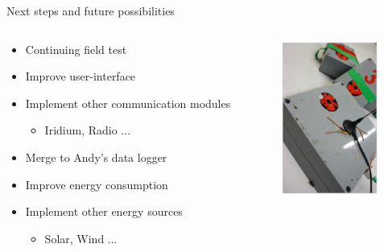 \documentclass{beamer}
\begin{document}
\begin{frame}{Next steps and future possibilities}
\begin{columns}[T]
	\begin{column}[T]{7cm}
		\begin{itemize}
		\item Continuing field test
		\item Improve user-interface
		\item Implement other communication modules
			\begin{itemize}
			\item Iridium, Radio ...
			\end{itemize}
		\item Merge to Andy's data logger
		\item Improve energy consumption
		\item Implement other energy sources 
			\begin{itemize}
			\item Solar, Wind ...
			\end{itemize}
		\end{itemize}
	\end{column}
	\begin{column}[T]{4cm}
	\includegraphics[height=5cm]{graphics/Field_pictures/Dirty_system.JPG}
	\end{column}
\end{columns}
\end{frame}
\end{document}
